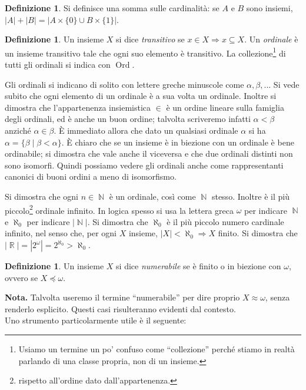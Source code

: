\documentclass[12pt,a4paper]{report}
\theoremstyle{definition}
\newtheorem{defn}[teo]{Definizione}  %
\theoremstyle{num.custom-title}
\DeclareMathOperator{\Ord}{\text{Ord}}
\DeclareMathOperator{\N}{\mathbb{N}}
\DeclareMathOperator{\R}{\mathbb{R}}
\DeclareMathOperator{\imp}{\Rightarrow}
\begin{document}
\begin{defn}
Si definisce una somma sulle cardinalità: se $A$ e $B$ sono insiemi, $|A|+|B|=|A \times \{0\} \cup B \times \{1\}|$.
\end{defn}

\begin{defn}
Un insieme $X$ si dice \emph{transitivo} se $x \in X \imp x \subseteq X$. Un \emph{ordinale} è un insieme transitivo tale che ogni suo elemento è transitivo. La collezione\footnote{Usiamo un termine un po' confuso come ``collezione'' perché stiamo in realtà parlando di una classe propria, non di un insieme.} di tutti gli ordinali si indica con $\Ord$.
\end{defn}

Gli ordinali si indicano di solito con lettere greche minuscole come $\alpha, \beta,...$ Si vede subito che ogni elemento di un ordinale è a sua volta un ordinale. Inoltre si dimostra che l'appartenenza insiemistica $\in$ è un ordine lineare sulla famiglia degli ordinali, ed è anche un buon ordine; talvolta scriveremo infatti $\alpha < \beta$ anziché $\alpha \in \beta$. È immediato allora che dato un qualsiasi ordinale $\alpha$ si ha $\alpha=\{\beta \mid \beta < \alpha\}$. È chiaro che se un insieme è in biezione con un ordinale è bene ordinabile; si dimostra che vale anche il viceversa e che due ordinali distinti non sono isomorfi. Quindi possiamo vedere gli ordinali anche come rappresentanti canonici di buoni ordini a meno di isomorfismo.

Si dimostra che ogni $n \in \N$ è un ordinale, così come $\N$ stesso. Inoltre è il più piccolo\footnote{rispetto all'ordine dato dall'appartenenza.} ordinale infinito. In logica spesso si usa la lettera greca $\omega$ per indicare $\N$ e $\aleph_0$ per indicare $|\N|$. Si dimostra che $\aleph_0$ è il più piccolo numero cardinale infinito, nel senso che, per ogni $X$ insieme, $|X|<\aleph_0 \imp X$ finito. Si dimostra che $|\R|=|2^\omega|=2^{\aleph_0} > \aleph_0$.

\begin{defn}
Un insieme $X$ si dice \emph{numerabile} se è finito o in biezione con $\omega$, ovvero se $X \preceq \omega$.
\end{defn}

\noindent\textbf{Nota.} Talvolta useremo il termine ``numerabile'' per dire proprio $X \approx \omega$, senza renderlo esplicito. Questi casi risulteranno evidenti dal contesto.\\

Uno strumento particolarmente utile è il seguente:
\end{document}
